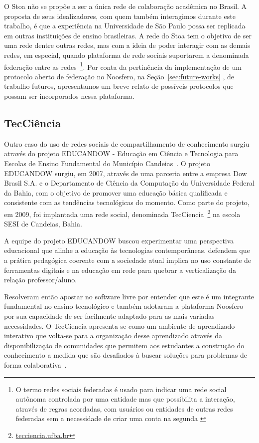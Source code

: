 O Stoa não se propõe a ser a única rede de colaboração acadêmica no Brasil. A
proposta de seus idealizadores, com quem também interagimos durante este trabalho,
é que a experiência na Universidade de São Paulo possa ser replicada em
outras instituições de ensino brasileiras.
%
A rede do Stoa tem o objetivo de ser uma rede dentre outras redes, mas com a ideia de poder
interagir com as demais redes, em especial, quando plataforma de rede sociais suportarem
a denominada federação entre as redes~\footnote{O termo redes sociais federadas é usado 
para indicar uma rede social autônoma controlada por uma entidade mas que possibilita a
interação, através de regras acordadas, com usuários ou entidades de outras redes
federadas sem a necessidade de criar uma conta na segunda \cite{prodomou2010}}.
%
Por conta da pertinência da implementação de um protocolo aberto de federação no Noosfero,
na Seção~\ref{sec:future-works} , de trabalho futuros, apresentamos um breve relato de possíveis
protocolos que possam ser incorporados nessa plataforma.

\subsection{TecCiência}
\label{subsec:tecciencia}

Outro caso do uso de redes sociais de compartilhamento de conhecimento surgiu através do
projeto EDUCANDOW  - Educação em Ciência e Tecnologia para
Escolas de Ensino Fundamental do Município Candeias~\cite{santos2012}.
%
O projeto EDUCANDOW surgiu, em 2007, através de uma parceria entre a empresa
Dow Brasil S.A. e o Departamento de Ciência da Computação da Universidade Federal da Bahia,
com o objetivo de promover uma educação básica qualificada e consistente com as tendências tecnológicas
do momento.
%
Como parte do projeto, em 2009, foi implantada uma rede social, denominada TecCiencia~\footnote{\url{tecciencia.ufba.br}}
na escola SESI de Candeias, Bahia.

A equipe do projeto EDUCANDOW buscou experimentar uma perspectiva educacional que
alinhe a educação às tecnologias contemporâneas.
%
 defendem que a prática pedagógica coerente com a sociedade atual
implica no uso constante de ferramentas digitais e na educação em rede para quebrar a
verticalização da relação professor/aluno.

Resolveram então apostar no software livre por entender que este é um integrante
fundamental no ensino tecnológico e também adotaram a plataforma Noosfero por sua
capacidade de ser facilmente adaptado para as mais variadas necessidades. O
TecCiencia apresenta-se como um ambiente de aprendizado interativo que volta-se
para a organização desse aprendizado através da disponibilização de comunidades
que permitem aos estudantes a construção do conhecimento a medida que são
desafiados à buscar soluções para problemas de forma colaborativa~\cite{santos2012}.

